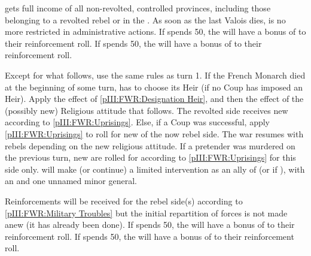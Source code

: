 \phadm
\aparag \FRA gets full income of all non-revolted, controlled provinces,
including those belonging to a revolted rebel or in the \ROTW.
\aparag As soon as the last Valois dies, \FRA is no more restricted in
administrative actions.
\bparag If \LIG spends 50\ducats, the \lig will have a bonus of  to
their reinforcement roll.
\bparag If \HUG spends 50\ducats, the \hug will have a bonus of  to
their reinforcement roll.


\phevnt
\aparag Except for what follows, use the same rules as turn 1.
\aparag If the French Monarch  died at the beginning of
some turn, \FRA has to choose its Heir (if no Coup has imposed an Heir). Apply
the effect of \ref{pIII:FWR:Designation Heir}, and then the effect of the
(possibly new) Religious attitude that follows. The revolted side receives new
\REVOLT according to \ref{pIII:FWR:Uprisings}.
\aparag Else, if a Coup was successful, apply \ref{pIII:FWR:Uprisings} to roll
for new \REVOLT of the now rebel side. The war resumes with rebels depending
on the new religious attitude.
\aparag If a pretender was murdered on the previous turn, new \REVOLT are
rolled for according to \ref{pIII:FWR:Uprisings} for this side only.
\aparag \paysSavoie will make (or continue) a limited intervention as an ally
of \lig (or \FRA if \CATHCR), with an \ARMY \faceplus and one unnamed minor
general.

\phadm
{}
\bparag Reinforcements will be received for the rebel side(s) according to
\ref{pIII:FWR:Military Troubles} but the initial repartition of forces is not
made anew (it has already been done).
\bparag If \LIG spends 50\ducats, the \lig will have a bonus of  to
their reinforcement roll.
\bparag If \HUG spends 50\ducats, the \hug will have a bonus of  to
their reinforcement roll.

